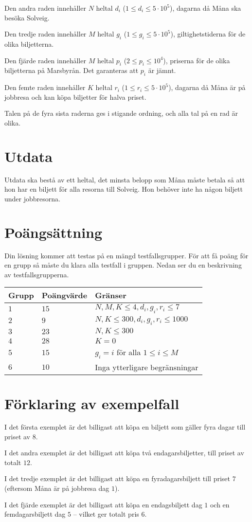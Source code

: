 Den andra raden innehåller $N$ heltal $d_i$ ($1 \leq d_i \leq 5\cdot10^5$), dagarna då Måna ska besöka Solveig.

Den tredje raden innehåller $M$ heltal $g_i$ ($1 \leq g_i \leq 5\cdot10^5$), giltighetstiderna för de olika biljetterna.

Den fjärde raden innehåller $M$ heltal $p_i$ ($2 \leq p_i \leq 10^4$), priserna för de olika biljetterna på Marsbyrån. Det garanteras att $p_i$ är jämnt.

Den femte raden innehåller $K$ heltal $r_i$ ($1 \leq r_i \leq 5\cdot10^5$), dagarna då Måna är på jobbresa och kan köpa biljetter för halva priset.

Talen på de fyra sista raderna ges i stigande ordning, och alla tal på en rad är olika.

\section*{Utdata}
Utdata ska bestå av ett heltal, det minsta belopp som Måna måste betala så att hon har en biljett för alla resorna till Solveig. Hon behöver inte ha någon biljett under jobbresorna.

\section*{Poängsättning}
Din lösning kommer att testas på en mängd testfallsgrupper.
För att få poäng för en grupp så måste du klara alla testfall i gruppen.
Nedan ser du en beskrivning av testfallsgrupperna.

\noindent
\begin{tabular}{| l | l | l |}
\hline
Grupp & Poängvärde & Gränser \\ \hline
$1$    & $15$         & $N, M, K\leq 4, d_i,g_i,r_i\leq 7$ \\ \hline
$2$    & $9$         & $N, K\leq 300, d_i,g_i,r_i\leq 1000$ \\ \hline
$3$    & $23$         & $N, K\leq 300$ \\ \hline
$4$    & $28$         & $K=0$ \\ \hline
$5$    & $15$         & $g_i=i$ för alla $1\leq i\leq M$ \\ \hline
$6$    & $10$         & Inga ytterligare begränsningar \\ \hline
\end{tabular}

\section*{Förklaring av exempelfall}
I det första exemplet är det billigast att köpa en biljett som gäller fyra dagar till priset av $8$.

I det andra exemplet är det billigast att köpa två endagarsbiljetter, till priset av totalt $12$.

I det tredje exemplet är det billigast att köpa en fyradagarsbiljett till priset $7$ (eftersom Måna är på jobbresa dag $1$).

I det fjärde exemplet är det billigast att köpa en endagsbiljett dag $1$ och en femdagarsbiljett dag $5$ -- vilket ger totalt pris $6$.
